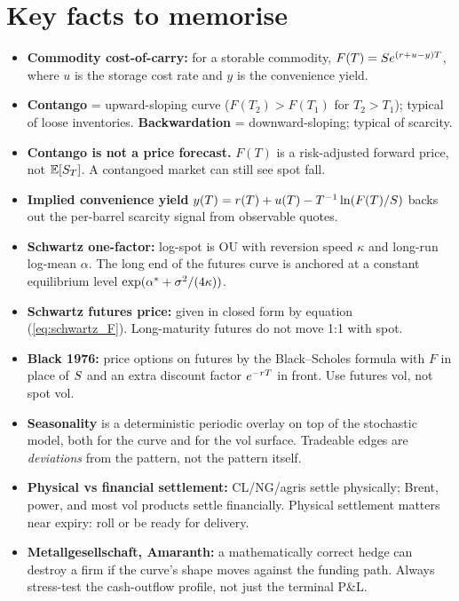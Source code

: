 \section{Key facts to memorise}
\label{sec:commodity_keyfacts}

\begin{itemize}
  \item \textbf{Commodity cost-of-carry:} for a storable commodity,
    $F(T) = S e^{(r + u - y)T}$, where $u$ is the storage cost
    rate and $y$ is the convenience yield.
  \item \textbf{Contango} = upward-sloping curve ($F(T_2) > F(T_1)$
    for $T_2 > T_1$); typical of loose inventories.
    \textbf{Backwardation} = downward-sloping; typical of scarcity.
  \item \textbf{Contango is not a price forecast.} $F(T)$ is a
    risk-adjusted forward price, not $\mathbb{E}[S_T]$.  A contangoed
    market can still see spot fall.
  \item \textbf{Implied convenience yield}
    $y(T) = r(T) + u(T) - T^{-1}\ln(F(T)/S)$ backs out the
    per-barrel scarcity signal from observable quotes.
  \item \textbf{Schwartz one-factor:} log-spot is OU with reversion
    speed $\kappa$ and long-run log-mean $\alpha$.  The long end of
    the futures curve is anchored at a constant equilibrium level
    $\exp(\alpha^* + \sigma^2/(4\kappa))$.
  \item \textbf{Schwartz futures price:} given in closed form by
    equation (\ref{eq:schwartz_F}).  Long-maturity futures do not
    move 1:1 with spot.
  \item \textbf{Black 1976:} price options on futures by the
    Black--Scholes formula with $F$ in place of $S$ and an
    extra discount factor $e^{-r T}$ in front.  Use futures
    vol, not spot vol.
  \item \textbf{Seasonality} is a deterministic periodic overlay on
    top of the stochastic model, both for the curve and for the
    vol surface.  Tradeable edges are \emph{deviations} from the
    pattern, not the pattern itself.
  \item \textbf{Physical vs financial settlement:} CL/NG/agris
    settle physically; Brent, power, and most vol products settle
    financially.  Physical settlement matters near expiry: roll
    or be ready for delivery.
  \item \textbf{Metallgesellschaft, Amaranth:} a mathematically
    correct hedge can destroy a firm if the curve's shape moves
    against the funding path.  Always stress-test the
    cash-outflow profile, not just the terminal P\&L.
\end{itemize}
